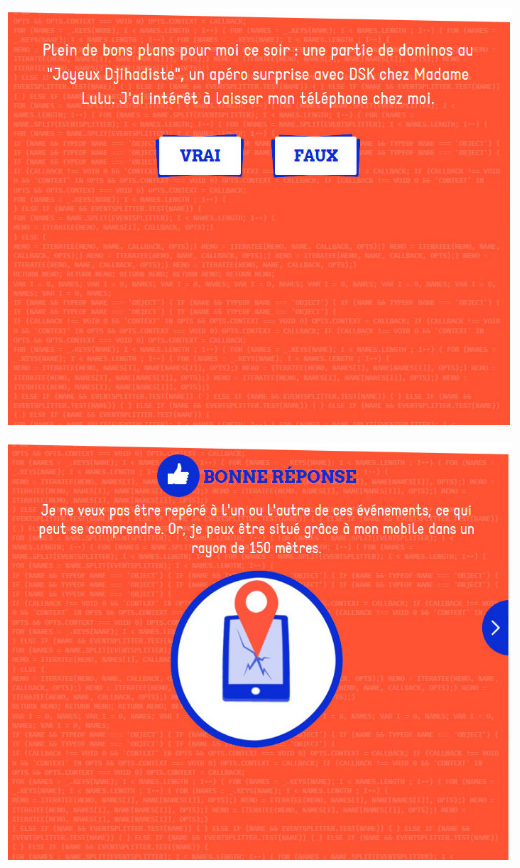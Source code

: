 \documentclass{beamer}
\begin{document}
\begin{frame}\includegraphics[scale=0.6] {./images/Quizz_HygieneNumerique_France4_18.jpg} \end{frame}
\begin{frame}\includegraphics[scale=0.6] {./images/Quizz_HygieneNumerique_France4_19.jpg} \end{frame}
\end{document}
